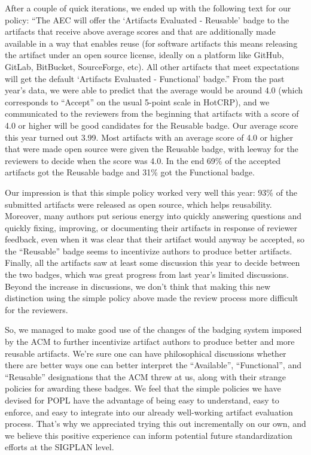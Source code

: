 After a couple of quick iterations, we ended up with the following
text for our policy: “The AEC will offer the ‘Artifacts Evaluated -
Reusable’ badge to the artifacts that receive above average scores and
that are additionally made available in a way that enables reuse (for
software artifacts this means releasing the artifact under an open
source license, ideally on a platform like GitHub, GitLab, BitBucket,
SourceForge, etc). All other artifacts that meet expectations will get
the default ‘Artifacts Evaluated - Functional’ badge.” From the past
year’s data, we were able to predict that the average would be around
4.0 (which corresponds to “Accept” on the usual 5-point scale in
HotCRP), and we communicated to the reviewers from the beginning that
artifacts with a score of 4.0 or higher will be good candidates for
the Reusable badge. Our average score this year turned out 3.99. Most
artifacts with an average score of 4.0 or higher that were made open
source were given the Reusable badge, with leeway for the reviewers to
decide when the score was 4.0. In the end 69\% of the accepted
artifacts got the Reusable badge and 31\% got the Functional badge.


Our impression is that this simple policy worked very well this year:
93\% of the submitted artifacts were released as open source, which
helps reusability. Moreover, many authors put serious energy into
quickly answering questions and quickly fixing, improving, or
documenting their artifacts in response of reviewer feedback, even
when it was clear that their artifact would anyway be accepted, so the
“Reusable” badge seems to incentivize authors to produce better
artifacts. Finally, all the artifacts saw at least some discussion
this year to decide between the two badges, which was great progress
from last year’s limited discussions. Beyond the increase in
discussions, we don’t think that making this new distinction using the
simple policy above made the review process more difficult for the
reviewers.


So, we managed to make good use of the changes of the badging system
imposed by the ACM to further incentivize artifact authors to produce
better and more reusable artifacts. We’re sure one can have
philosophical discussions whether there are better ways one can better
interpret the “Available”, “Functional”, and “Reusable” designations
that the ACM threw at us, along with their strange policies for
awarding these badges. We feel that the simple policies we have
devised for POPL have the advantage of being easy to understand, easy
to enforce, and easy to integrate into our already well-working
artifact evaluation process. That’s why we appreciated trying this out
incrementally on our own, and we believe this positive experience can
inform potential future standardization efforts at the SIGPLAN level.

